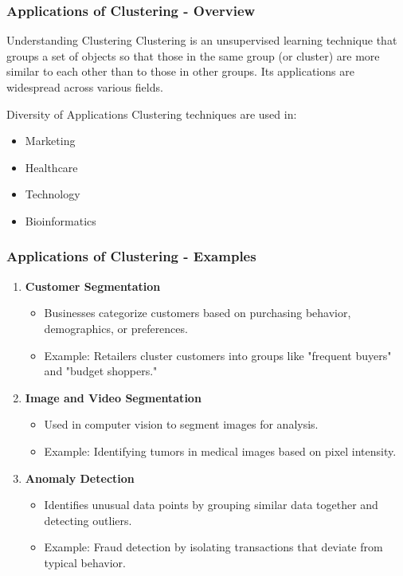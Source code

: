 \documentclass[aspectratio=169]{beamer}
\begin{document}
\begin{frame}[fragile]
    \frametitle{Applications of Clustering - Overview}
    \begin{block}{Understanding Clustering}
        Clustering is an unsupervised learning technique that groups a set of objects so that those in the same group (or cluster) are more similar to each other than to those in other groups. Its applications are widespread across various fields.
    \end{block}

    \begin{block}{Diversity of Applications}
        Clustering techniques are used in:
        \begin{itemize}
            \item Marketing
            \item Healthcare
            \item Technology
            \item Bioinformatics
        \end{itemize}
    \end{block}
\end{frame}

\begin{frame}[fragile]
    \frametitle{Applications of Clustering - Examples}
    \begin{enumerate}
        \item \textbf{Customer Segmentation}
            \begin{itemize}
                \item Businesses categorize customers based on purchasing behavior, demographics, or preferences.
                \item Example: Retailers cluster customers into groups like "frequent buyers" and "budget shoppers."
            \end{itemize}
        
        \item \textbf{Image and Video Segmentation}
            \begin{itemize}
                \item Used in computer vision to segment images for analysis.
                \item Example: Identifying tumors in medical images based on pixel intensity.
            \end{itemize}
        
        \item \textbf{Anomaly Detection}
            \begin{itemize}
                \item Identifies unusual data points by grouping similar data together and detecting outliers.
                \item Example: Fraud detection by isolating transactions that deviate from typical behavior.
            \end{itemize}
    \end{enumerate}
\end{frame}
\end{document}
